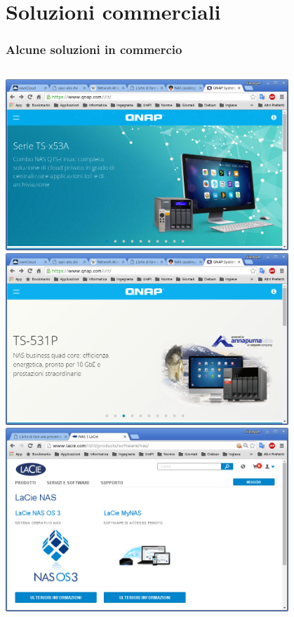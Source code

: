\documentclass[11pt,xcolor=table]{beamer}
\begin{document}
\section{Soluzioni commerciali}
\begin{frame}
	\frametitle{Alcune soluzioni in commercio}
	\begin{columns}
		\begin{column}{0.48\textwidth}
			\centering
			\includegraphics[width=0.8\textwidth]{NasComm/NAS1.png}
			\vspace{1mm}
			\includegraphics[width=0.8\textwidth]{NasComm/NAS2.png}
			\vspace{1mm}
			\includegraphics[width=0.8\textwidth]{NasComm/NAS5.png}

\end{column}
\end{columns}
\end{frame}
\end{document}
